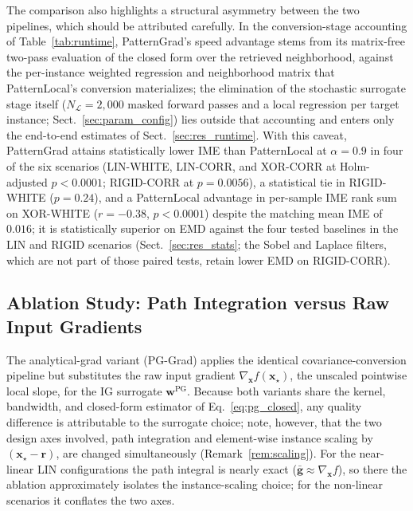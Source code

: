 \documentclass[pdflatex,sn-mathphys-num]{sn-jnl}
\theoremstyle{thmstyleone}
\theoremstyle{thmstyletwo}%
\theoremstyle{thmstylethree}%
\begin{document}
The comparison also highlights a structural asymmetry between the two pipelines, which should be attributed carefully. In the conversion-stage accounting of Table~\ref{tab:runtime}, PatternGrad's speed advantage stems from its matrix-free two-pass evaluation of the closed form over the retrieved neighborhood, against the per-instance weighted regression and neighborhood matrix that PatternLocal's conversion materializes; the elimination of the stochastic surrogate stage itself ($N_{\mathcal{L}} = 2{,}000$ masked forward passes and a local regression per target instance; Sect.~\ref{sec:param_config}) lies outside that accounting and enters only the end-to-end estimates of Sect.~\ref{sec:res_runtime}. With this caveat, PatternGrad attains statistically lower IME than PatternLocal at $\alpha = 0.9$ in four of the six scenarios (LIN-WHITE, LIN-CORR, and XOR-CORR at Holm-adjusted $p < 0.0001$; RIGID-CORR at $p = 0.0056$), a statistical tie in RIGID-WHITE ($p = 0.24$), and a PatternLocal advantage in per-sample IME rank sum on XOR-WHITE ($r = -0.38$, $p < 0.0001$) despite the matching mean IME of $0.016$; it is statistically superior on EMD against the four tested baselines in the LIN and RIGID scenarios (Sect.~\ref{sec:res_stats}; the Sobel and Laplace filters, which are not part of those paired tests, retain lower EMD on RIGID-CORR).

\subsection{Ablation Study: Path Integration versus Raw Input Gradients}\label{sec:res_ablation}

The analytical-grad variant (PG-Grad) applies the identical covariance-conversion pipeline but substitutes the raw input gradient $\nabla_{\mathbf{x}} f(\mathbf{x}_\star)$, the unscaled pointwise local slope, for the IG surrogate $\mathbf{w}^{\text{PG}}$. Because both variants share the kernel, bandwidth, and closed-form estimator of Eq.~\eqref{eq:pg_closed}, any quality difference is attributable to the surrogate choice; note, however, that the two design axes involved, path integration and element-wise instance scaling by $(\mathbf{x}_\star - \mathbf{r})$, are changed simultaneously (Remark~\ref{rem:scaling}). For the near-linear LIN configurations the path integral is nearly exact ($\bar{\mathbf{g}} \approx \nabla_{\mathbf{x}} f$), so there the ablation approximately isolates the instance-scaling choice; for the non-linear scenarios it conflates the two axes.
\end{document}
